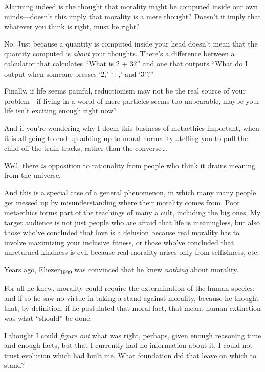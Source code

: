  Alarming indeed is the thought that morality might be computed
inside our own minds---doesn't this imply that morality
is a mere thought? Doesn't it imply that whatever you
think is right, must be right?


 No. Just because a quantity is computed inside your head
doesn't mean that the quantity computed is
\textit{about} your thoughts. There's a difference
between a calculator that calculates ``What is 2 +
3?'' and one that outputs ``What do
I output when someone presses `2,'
`+,' and
`3'?''


 Finally, if life seems painful, reductionism may not be the real
source of your problem---if living in a world of mere particles seems
too unbearable, maybe your life isn't exciting enough
right now?


 And if you're wondering why I deem this business
of metaethics important, when it is all going to end up adding up to
moral normality\,\ldots telling you to pull the child off the train
tracks, rather than the converse\,\ldots


 Well, there \textit{is} opposition to rationality from people who
think it drains meaning from the universe.


 And this is a special case of a general phenomenon, in which many
many people get messed up by misunderstanding where their morality
comes from. Poor metaethics forms part of the teachings of many a cult,
including the big ones. My target audience is not just people who are
afraid that life is meaningless, but also those who've
concluded that love is a delusion because real morality has to involve
maximizing your inclusive fitness, or those who've
concluded that unreturned kindness is evil because real morality arises
only from selfishness, etc.

\myendsectiontext



 Years ago, Eliezer\textsubscript{1999} was convinced that he knew
\textit{nothing} about morality. 


 For all he knew, morality could require the extermination of the
human species; and if so he saw no virtue in taking a stand against
morality, because he thought that, by definition, if he postulated that
moral fact, that meant human extinction was what
``should'' be done.


 I thought I could \textit{figure out} what was right, perhaps,
given enough reasoning time and enough facts, but that I currently had
no information about it. I could not trust evolution which had built
me. What foundation did that leave on which to stand?


